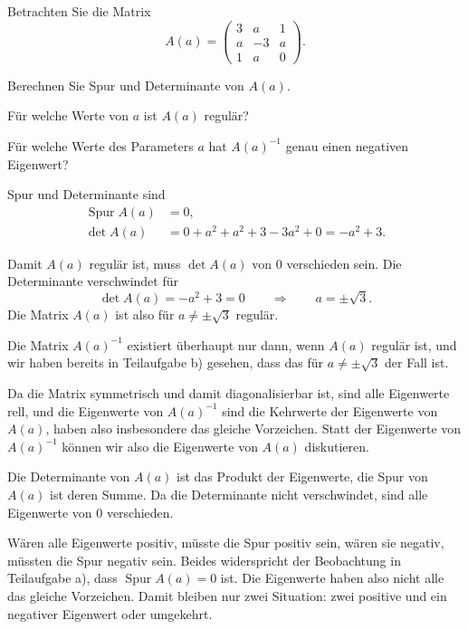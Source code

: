 Betrachten Sie die Matrix
\[
A(a)
=
\begin{pmatrix}
 3& a& 1\\
 a&-3& a\\
 1& a& 0
\end{pmatrix}.
\]
\begin{teilaufgaben}
\item
Berechnen Sie Spur und Determinante von $A(a)$.
\item 
Für welche Werte von $a$ ist $A(a)$ regulär?
\item
Für welche Werte des Parameters $a$ hat $A(a)^{-1}$
genau einen negativen Eigenwert?
\end{teilaufgaben}

\begin{loesung}
\begin{teilaufgaben}
\item Spur und Determinante sind
\begin{align}
\operatorname{Spur} A(a)
&=
0,
\label{60000027:tr}
\\
\det A(a)
&=
0 + a^2 + a^2 + 3 - 3 a^2 + 0
=
-a^2+3.
\label{60000027:det}
\end{align}
\item
Damit $A(a)$ regulär ist, muss $\det A(a)$
von $0$ verschieden sein.
Die Determinante verschwindet für
\[
\det A(a)
=
-a^2+3
=
0
\qquad
\Rightarrow
\qquad
a=\pm\sqrt{3}.
\]
Die Matrix $A(a)$ ist also für $a\ne\pm\sqrt{3}$ regulär.
\item
Die Matrix $A(a)^{-1}$ existiert überhaupt nur dann, wenn $A(a)$
regulär ist, und wir haben bereits in Teilaufgabe b) gesehen, dass
das für $a\ne\pm\sqrt{3}$ der Fall ist.

Da die Matrix symmetrisch und damit diagonalisierbar ist, sind alle
Eigenwerte rell, und die Eigenwerte von $A(a)^{-1}$ sind die
Kehrwerte der Eigenwerte von $A(a)$, haben also insbesondere
das gleiche Vorzeichen.
Statt der Eigenwerte von $A(a)^{-1}$ können wir also die Eigenwerte
von $A(a)$ diskutieren.

Die Determinante von $A(a)$ ist das Produkt der Eigenwerte, die Spur
von $A(a)$ ist deren Summe.
Da die Determinante nicht verschwindet, sind alle Eigenwerte von $0$
verschieden.

Wären alle Eigenwerte positiv, müsste die Spur positiv sein,
wären sie negativ, müssten die Spur negativ sein.
Beides widerspricht der Beobachtung in Teilaufgabe a), dass 
$\operatorname{Spur}A(a)=0$ ist.
Die Eigenwerte haben also nicht alle das gleiche Vorzeichen.
Damit bleiben nur zwei Situation: zwei positive und ein negativer
Eigenwert oder umgekehrt.


\end{teilaufgaben}
\end{loesung}
